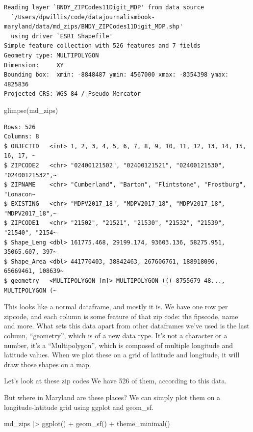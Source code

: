 \documentclass[
  letterpaper,
  DIV=11,
  numbers=noendperiod]{scrreprt}
\newenvironment{Shaded}{\begin{snugshade}}{\end{snugshade}}
\newcommand{\FunctionTok}[1]{\textcolor[rgb]{0.28,0.35,0.67}{#1}}
\newcommand{\NormalTok}[1]{\textcolor[rgb]{0.00,0.23,0.31}{#1}}
\newcommand{\SpecialCharTok}[1]{\textcolor[rgb]{0.37,0.37,0.37}{#1}}
\begin{document}
\begin{verbatim}
Reading layer `BNDY_ZIPCodes11Digit_MDP' from data source 
  `/Users/dpwillis/code/datajournalismbook-maryland/data/md_zips/BNDY_ZIPCodes11Digit_MDP.shp' 
  using driver `ESRI Shapefile'
Simple feature collection with 526 features and 7 fields
Geometry type: MULTIPOLYGON
Dimension:     XY
Bounding box:  xmin: -8848487 ymin: 4567000 xmax: -8354398 ymax: 4825836
Projected CRS: WGS 84 / Pseudo-Mercator
\end{verbatim}

\begin{Shaded}
\begin{Highlighting}[]
\FunctionTok{glimpse}\NormalTok{(md\_zips)}
\end{Highlighting}
\end{Shaded}

\begin{verbatim}
Rows: 526
Columns: 8
$ OBJECTID   <int> 1, 2, 3, 4, 5, 6, 7, 8, 9, 10, 11, 12, 13, 14, 15, 16, 17, ~
$ ZIPCODE2   <chr> "02400121502", "02400121521", "02400121530", "02400121532",~
$ ZIPNAME    <chr> "Cumberland", "Barton", "Flintstone", "Frostburg", "Lonacon~
$ EXISTING   <chr> "MDPV2017_18", "MDPV2017_18", "MDPV2017_18", "MDPV2017_18",~
$ ZIPCODE1   <chr> "21502", "21521", "21530", "21532", "21539", "21540", "2154~
$ Shape_Leng <dbl> 161775.468, 29199.174, 93603.136, 58275.951, 35065.607, 397~
$ Shape_Area <dbl> 441770403, 38842463, 267606761, 188918096, 65669461, 108639~
$ geometry   <MULTIPOLYGON [m]> MULTIPOLYGON (((-8755679 48..., MULTIPOLYGON (~
\end{verbatim}

This looks like a normal dataframe, and mostly it is. We have one row
per zipcode, and each column is some feature of that zip code: the
fipscode, name and more. What sets this data apart from other dataframes
we've used is the last column, ``geometry'', which is of a new data
type. It's not a character or a number, it's a ``Multipolygon'', which
is composed of multiple longitude and latitude values. When we plot
these on a grid of latitude and longitude, it will draw those shapes on
a map.

Let's look at these zip codes We have 526 of them, according to this
data.

But where in Maryland are these places? We can simply plot them on a
longitude-latitude grid using ggplot and geom\_sf.

\begin{Shaded}
\begin{Highlighting}[]
\NormalTok{md\_zips }\SpecialCharTok{|\textgreater{}}
  \FunctionTok{ggplot}\NormalTok{() }\SpecialCharTok{+}
  \FunctionTok{geom\_sf}\NormalTok{() }\SpecialCharTok{+}
  \FunctionTok{theme\_minimal}\NormalTok{()}
\end{Highlighting}
\end{Shaded}
\end{document}

